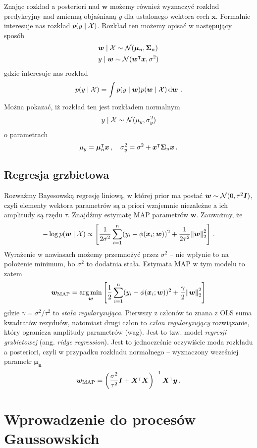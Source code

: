 \documentclass{myclass}
\begin{document}
Znając rozkład a posteriori nad \(\bm{w}\) możemy również wyznaczyć rozkład predykcyjny nad zmienną
objaśnianą \(y\) dla ustalonego wektora cech \(\bm{x}\). Formalnie interesuje nas rozkład \(p(y \mid
\mathcal{X})\). Rozkład ten możemy opisać w następujący sposób
\[
\begin{split}
    &\bm{w} \mid \mathcal{X} \sim \mathcal{N}(\bm{\mu}_n, \bm{\Sigma}_n)\\
    &y \mid \bm{w} \sim \mathcal{N}(\bm{w}^\intercal \bm{x}, \sigma^2)
\end{split}
\]
gdzie interesuje nas rozkład
\[
    p(y \mid \mathcal{X}) = \int p(y \mid \bm{w}) p(\bm{w} \mid \mathcal{X}) \dd{\bm{w}}\,.
\]
Można pokazać, iż rozkład ten jest rozkładem normalnym
\[
    y \mid \mathcal{X} \sim \mathcal{N}(\mu_y, \sigma_y^2)
\]
o parametrach
\[
    \mu_y = \bm{\mu}_n^\intercal \bm{x}\,,\quad \sigma^2_y = \sigma^2 + \bm{x}^\intercal \bm{\Sigma}_n \bm{x}\,.
\]

\subsection{Regresja grzbietowa}

Rozważmy Bayesowską regresję liniową, w której prior ma postać \(\bm{w} \sim \mathcal{N}(0,
\tau^2\bm{I})\), czyli elementy wektora parametrów są a priori wzajemnie niezależne a ich amplitudy
są rzędu \(\tau\). Znajdźmy estymatę MAP parametrów \(\bm{w}\). Zauważmy, że 
\[
-\log p(\bm{w} \mid \mathcal{X}) \propto \left[ \frac{1}{2\sigma^2}\sum_{i=1}^n (y_i - \phi(\bm{x}_i; \bm{w}))^2 + \frac{1}{2\tau^2}\norm{\bm{w}}_2^2 \right]\,. 
\]
Wyrażenie w nawiasach możemy przemnożyć przez \(\sigma^2\) -- nie wpłynie to na położenie minimum,
bo \(\sigma^2\) to dodatnia stała. Estymata MAP w tym modelu to zatem
\[
    \bm{w}_\text{MAP} = \operatorname*{arg\,min}_{\bm{w}} \left[ \frac{1}{2}\sum_{i=1}^n (y_i - \phi(\bm{x}_i; \bm{w}))^2 + \frac{\gamma}{2}\norm{\bm{w}}_2^2 \right]
\]
gdzie \(\gamma = \sigma^2 / \tau^2\) to \emph{stała regularyzująca}. Pierwszy z członów to znana z
OLS suma kwadratów rezyduów, natomiast drugi człon to \emph{człon regularyzujący} rozwiązanie, który
ogranicza amplitudy parametrów (wag). Jest to tzw. model \emph{regresji grzbietowej} (ang.
\emph{ridge regression}). Jest to jednocześnie oczywiście moda rozkładu a posteriori, czyli w
przypadku rozkładu normalnego -- wyznaczony wcześniej parametr \(\bm{\mu_n}\)
\[
    \bm{w}_\text{MAP} = \left(\frac{\sigma^2}{\tau^2}\bm{I} + \bm{X}^\intercal\bm{X}\right)^{-1}\bm{X}^\intercal\bm{y}\,.
\]

\section{Wprowadzenie do procesów Gaussowskich}
\end{document}

